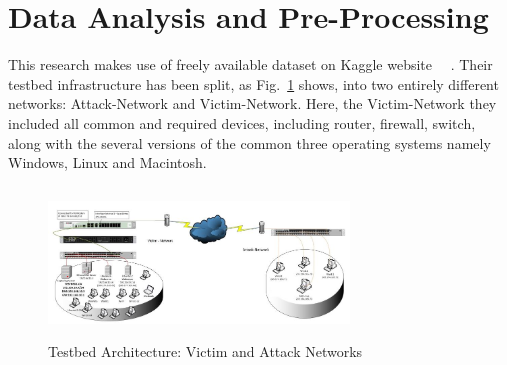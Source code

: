 \documentclass[conference]{IEEEtran}
\begin{document}
\section{Data Analysis and Pre-Processing}

This research makes use of freely available dataset on Kaggle website~\cite{8} ~\cite{9}. Their testbed infrastructure has been split, as Fig.~\ref{fig:architecture} shows, into two entirely different networks: Attack-Network and Victim-Network. Here, the Victim-Network they included all common and required devices, including router, firewall, switch, along with the several versions of the common three operating systems namely Windows, Linux and Macintosh.

\begin{figure}[htbp]
\centerline{\includegraphics[height=4cm,width=8cm]{TestedArchitecture.JPG}}
\caption{Testbed Architecture: Victim and Attack Networks ~\cite{13}}
\label{fig:architecture}
\end{figure}
\end{document}

